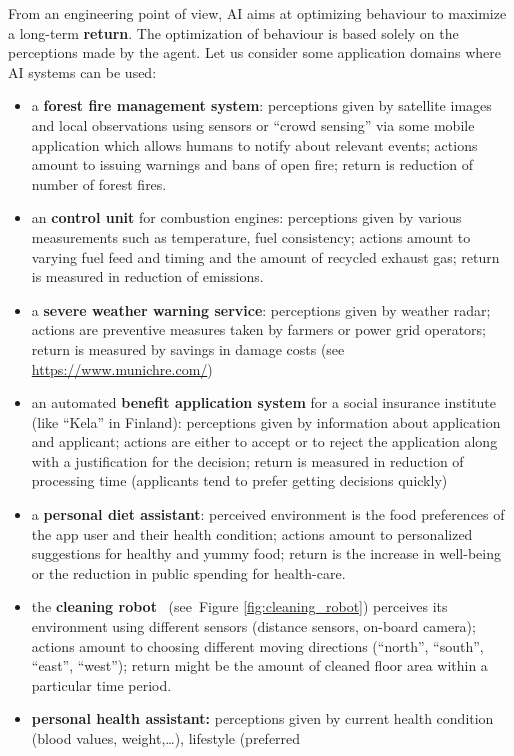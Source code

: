 \documentclass[12pt]{report}
\begin{document}
From an engineering point of view, AI aims at optimizing behaviour to 
maximize a long-term {\bf return}. The optimization of behaviour is based 
solely on the perceptions made by the agent. Let us consider some 
application domains where AI systems can be used:
\begin{itemize}
\item a {\bf forest fire management system}: perceptions given by 
satellite images and local observations using sensors or ``crowd sensing'' 
via some mobile application which allows humans to notify about 
relevant events; actions amount to issuing warnings and bans of 
open fire; return is reduction of number of forest fires. 
\item an {\bf control unit} for combustion engines: 
perceptions given by various measurements such as temperature, 
fuel consistency; actions amount to varying fuel feed and timing 
and the amount of recycled exhaust gas; return is measured in 
reduction of emissions.   
\item a {\bf severe weather warning service}: perceptions given by 
weather radar; actions are preventive measures taken by farmers or 
power grid operators; return is measured by savings in damage 
costs (see \url{https://www.munichre.com/})
\item an automated {\bf benefit application system} for a social 
insurance institute (like ``Kela'' in Finland): perceptions given by 
information about application and applicant; actions are either to 
accept or to reject the application along with a justification for the 
decision; return is measured in reduction of processing time 
(applicants tend to prefer getting decisions quickly)
\item  a {\bf personal diet assistant}: perceived environment is the 
food preferences of the app user and their health condition; actions 
amount to personalized suggestions for healthy and yummy food;  
return is the increase in well-being or the reduction in public spending 
for health-care.  
\item the {\bf cleaning robot} \rumba\, (see\ Figure \ref{fig:cleaning_robot}) 
perceives its environment using different sensors (distance sensors, 
on-board camera); actions amount to choosing different moving 
directions (``north'', ``south'', ``east'', ``west''); return might be the 
amount of cleaned floor area within a particular time period. 
\item {\bf personal health assistant:}  perceptions given by current 
health condition (blood values, weight,\ldots), lifestyle (preferred 

\end{itemize}
\end{document}
